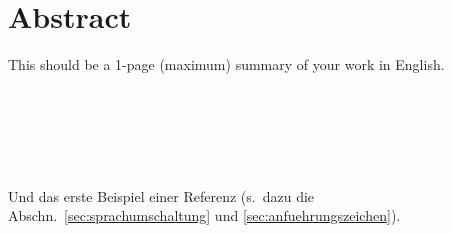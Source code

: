 \chapter{Abstract}

\begin{english} %
This should be a 1-page (maximum) summary of your work in English.
\end{english}
\\\\\\\\\\
Und das erste Beispiel einer Referenz
(s.\ dazu die Abschn.\ \ref{sec:sprachumschaltung} %
und \ref{sec:anfuehrungszeichen}).
